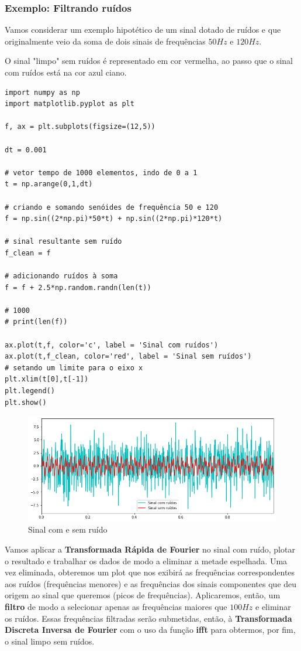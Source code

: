 \subsubsection{Exemplo: Filtrando ruídos}
Vamos considerar um exemplo hipotético de um sinal dotado de ruídos e que originalmente veio da soma de dois sinais de frequências $50Hz$ e $120Hz$.

O sinal "limpo" sem ruídos é representado em cor vermelha, ao passo que o sinal com ruídos está na cor azul ciano.

\begin{verbatim}
import numpy as np
import matplotlib.pyplot as plt

f, ax = plt.subplots(figsize=(12,5))

dt = 0.001

# vetor tempo de 1000 elementos, indo de 0 a 1
t = np.arange(0,1,dt)

# criando e somando senóides de frequência 50 e 120
f = np.sin((2*np.pi)*50*t) + np.sin((2*np.pi)*120*t)

# sinal resultante sem ruído
f_clean = f

# adicionando ruídos à soma
f = f + 2.5*np.random.randn(len(t))

# 1000
# print(len(f))

ax.plot(t,f, color='c', label = 'Sinal com ruídos')
ax.plot(t,f_clean, color='red', label = 'Sinal sem ruídos')
# setando um limite para o eixo x
plt.xlim(t[0],t[-1])
plt.legend()
plt.show()
\end{verbatim}

\begin{figure}[H]
	\centering
	\includegraphics[width=1\textwidth]{./Imagens/Transformada de Fourier/TF3.png} 
	\caption{Sinal com e sem ruído}
	\label{fig:TF3}
\end{figure}

Vamos aplicar a \textbf{Transformada Rápida de Fourier} no sinal com ruído, plotar o resultado e trabalhar os dados de modo a eliminar a metade espelhada. Uma vez eliminada, obteremos um plot que nos exibirá as frequências correspondentes aos ruídos (frequências menores) e as frequências dos sinais componentes que deu origem ao sinal que queremos (picos de frequências). Aplicaremos, então, um \textbf{filtro} de modo a selecionar apenas as frequências maiores que $100Hz$ e eliminar os ruídos. Essas frequências filtradas serão submetidas, então, à \textbf{Transformada Discreta Inversa de Fourier} com o uso da função \textbf{ifft} para obtermos, por fim, o sinal limpo sem ruídos.


